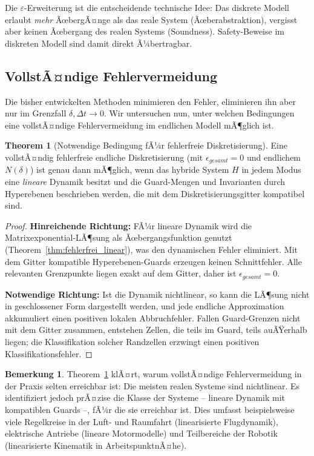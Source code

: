 ﻿\documentclass[a4paper,12pt]{article}
\theoremstyle{definition}
\newtheorem{theorem}{Theorem}[section]
\newtheorem{remark}{Bemerkung}[section]
\begin{document}
Die $\varepsilon$-Erweiterung ist die entscheidende technische Idee: Das diskrete Modell erlaubt \emph{mehr} ÃœbergÃ¤nge als das reale System (Ãœberabstraktion), vergisst aber keinen Ãœbergang des realen Systems (Soundness). Safety-Beweise im diskreten Modell sind damit direkt Ã¼bertragbar.

\subsection{VollstÃ¤ndige Fehlervermeidung}

Die bisher entwickelten Methoden minimieren den Fehler, eliminieren ihn aber nur im Grenzfall $\delta, \Delta t \to 0$. Wir untersuchen nun, unter welchen Bedingungen eine vollstÃ¤ndige Fehlervermeidung im endlichen Modell mÃ¶glich ist.

\begin{theorem}[Notwendige Bedingung fÃ¼r fehlerfreie Diskretisierung]
\label{thm:notwendig}
Eine vollstÃ¤ndig fehlerfreie endliche Diskretisierung (mit $\epsilon_{\mathit{gesamt}} = 0$ und endlichem $N(\delta)$) ist genau dann mÃ¶glich, wenn das hybride System $H$ in jedem Modus eine \emph{lineare} Dynamik besitzt und die Guard-Mengen und Invarianten durch Hyperebenen beschrieben werden, die mit dem Diskretisierungsgitter kompatibel sind.
\end{theorem}

\begin{proof}
\textbf{Hinreichende Richtung:} FÃ¼r lineare Dynamik wird die Matrixexponential-LÃ¶sung als Ãœbergangsfunktion genutzt (Theorem~\ref{thm:fehlerfrei_linear}), was den dynamischen Fehler eliminiert. Mit dem Gitter kompatible Hyperebenen-Guards erzeugen keinen Schnittfehler. Alle relevanten Grenzpunkte liegen exakt auf dem Gitter, daher ist $\epsilon_{\mathit{gesamt}} = 0$.

\textbf{Notwendige Richtung:} Ist die Dynamik nichtlinear, so kann die LÃ¶sung nicht in geschlossener Form dargestellt werden, und jede endliche Approximation akkumuliert einen positiven lokalen Abbruchfehler. Fallen Guard-Grenzen nicht mit dem Gitter zusammen, entstehen Zellen, die teils im Guard, teils auÃŸerhalb liegen; die Klassifikation solcher Randzellen erzwingt einen positiven Klassifikationsfehler.
\end{proof}

\begin{remark}
Theorem~\ref{thm:notwendig} klÃ¤rt, warum vollstÃ¤ndige Fehlervermeidung in der Praxis selten erreichbar ist: Die meisten realen Systeme sind nichtlinear. Es identifiziert jedoch prÃ¤zise die Klasse der Systeme -- lineare Dynamik mit kompatiblen Guards --, fÃ¼r die sie erreichbar ist. Dies umfasst beispielsweise viele Regelkreise in der Luft- und Raumfahrt (linearisierte Flugdynamik), elektrische Antriebe (lineare Motormodelle) und Teilbereiche der Robotik (linearisierte Kinematik in ArbeitspunktnÃ¤he).
\end{remark}
\end{document}
